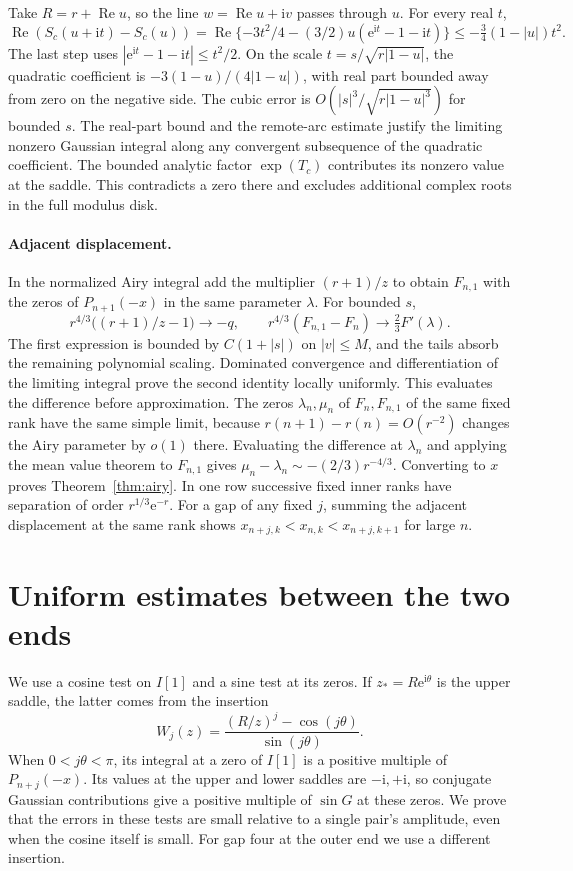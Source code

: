 \documentclass[11pt]{article}
\DeclareMathOperator{\Rea}{Re}
\newcommand{\ee}{\mathrm e}
\newcommand{\ii}{\mathrm i}
\begin{document}
Take \(R=r+\Rea u\), so the line \(w=\Rea u+\ii v\) passes through \(u\). For every real \(t\),
\[
 \Rea(S_c(u+\ii t)-S_c(u))
 =\Rea\{-3t^2/4-(3/2)u(\ee^{\ii t}-1-\ii t)\}
 \le-\tfrac34(1-|u|)t^2 .
\]
The last step uses \(|\ee^{\ii t}-1-\ii t|\le t^2/2\). On the scale \(t=s/\sqrt{r|1-u|}\), the quadratic coefficient is \(-3(1-u)/(4|1-u|)\), with real part bounded away from zero on the negative side. The cubic error is \(O(|s|^3/\sqrt{r|1-u|^3})\) for bounded \(s\). The real-part bound and the remote-arc estimate justify the limiting nonzero Gaussian integral along any convergent subsequence of the quadratic coefficient. The bounded analytic factor \(\exp(T_c)\) contributes its nonzero value at the saddle. This contradicts a zero there and excludes additional complex roots in the full modulus disk.

\paragraph{Adjacent displacement.}
In the normalized Airy integral add the multiplier \((r+1)/z\) to obtain \(F_{n,1}\) with the zeros of \(P_{n+1}(-x)\) in the same parameter \(\lambda\). For bounded \(s\),
\[
 r^{4/3}\bigl((r+1)/z-1\bigr)\to-q,\qquad
 r^{4/3}(F_{n,1}-F_n)\to\tfrac23 F'(\lambda).
\]
The first expression is bounded by \(C(1+|s|)\) on \(|v|\le M\), and the tails absorb the remaining polynomial scaling. Dominated convergence and differentiation of the limiting integral prove the second identity locally uniformly. This evaluates the difference before approximation. The zeros \(\lambda_n,\mu_n\) of \(F_n,F_{n,1}\) of the same fixed rank have the same simple limit, because \(r(n+1)-r(n)=O(r^{-2})\) changes the Airy parameter by \(o(1)\) there. Evaluating the difference at \(\lambda_n\) and applying the mean value theorem to \(F_{n,1}\) gives \(\mu_n-\lambda_n\sim-(2/3) r^{-4/3}\). Converting to \(x\) proves Theorem~\ref{thm:airy}. In one row successive fixed inner ranks have separation of order \(r^{1/3}\ee^{-r}\). For a gap of any fixed \(j\), summing the adjacent displacement at the same rank shows \(x_{n+j,k}<x_{n,k}<x_{n+j,k+1}\) for large \(n\).

\section{Uniform estimates between the two ends}\label{sec:bridge}

We use a cosine test on \(I[1]\) and a sine test at its zeros. If \(z_*=R\ee^{\ii\theta}\) is the upper saddle, the latter comes from the insertion
\begin{equation}
 W_j(z)=\frac{(R/z)^j-\cos(j\theta)}{\sin(j\theta)}.
 \label{eq:centerweight}
\end{equation}
When \(0<j\theta<\pi\), its integral at a zero of \(I[1]\) is a positive multiple of \(P_{n+j}(-x)\). Its values at the upper and lower saddles are \(-\ii,+\ii\), so conjugate Gaussian contributions give a positive multiple of \(\sin G\) at these zeros. We prove that the errors in these tests are small relative to a single pair's amplitude, even when the cosine itself is small. For gap four at the outer end we use a different insertion.
\end{document}
